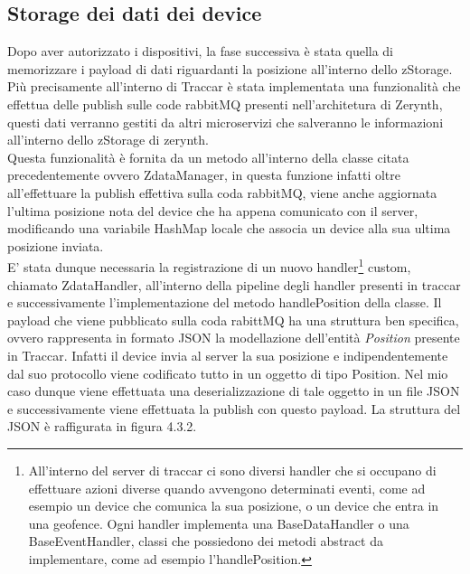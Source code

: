 \documentclass[a4paper,titlepage,12pt]{book}
\begin{document}
\subsection{\sffamily
Storage dei dati dei device}
Dopo aver autorizzato i dispositivi, la fase successiva è stata quella di memorizzare i payload di dati riguardanti la posizione all'interno dello zStorage. Più precisamente all'interno di Traccar è stata implementata una funzionalità che effettua delle publish sulle code rabbitMQ presenti nell'architetura di Zerynth, questi dati verranno gestiti da altri microservizi che salveranno le informazioni all'interno dello zStorage di zerynth.\\
Questa funzionalità è fornita da un metodo all'interno della classe citata precedentemente ovvero ZdataManager, in questa funzione infatti oltre all'effettuare la publish effettiva sulla coda rabbitMQ, viene anche aggiornata l'ultima posizione nota del device che ha appena comunicato con il server, modificando una variabile HashMap locale che associa un device alla sua ultima posizione inviata.\\
E' stata dunque necessaria la registrazione di un nuovo handler\footnote{\sffamily
All'interno del server di traccar ci sono diversi handler che si occupano di effettuare azioni diverse quando avvengono determinati eventi, come ad esempio un device che comunica la sua posizione, o un device che entra in una geofence. Ogni handler implementa una BaseDataHandler o una BaseEventHandler, classi che possiedono dei metodi abstract da implementare, come ad esempio l'handlePosition.} custom, chiamato ZdataHandler, all'interno della pipeline degli handler presenti in traccar e successivamente l'implementazione del metodo handlePosition della classe.
Il payload che viene pubblicato sulla coda rabittMQ ha una struttura ben specifica, ovvero rappresenta in formato JSON la modellazione dell'entità \textit{Position} presente in Traccar. Infatti il device invia al server la sua posizione e indipendentemente dal suo protocollo viene codificato tutto in un oggetto di tipo Position. Nel mio caso dunque viene effettuata una deserializzazione di tale oggetto in un file JSON e successivamente viene effettuata la publish con questo payload. La struttura del JSON è raffigurata in figura 4.3.2.
\end{document}
